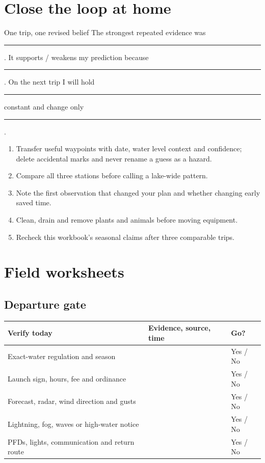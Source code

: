 \section{Close the loop at home}
\begin{teloscard}{One trip, one revised belief}
The strongest repeated evidence was \rule{3.6in}{.4pt}. It supports / weakens
my prediction because \rule{3.25in}{.4pt}. On the next trip I will hold
\rule{1.25in}{.4pt} constant and change only \rule{1.5in}{.4pt}.
\end{teloscard}
\begin{enumerate}
\item Transfer useful waypoints with date, water level context and confidence;
delete accidental marks and never rename a guess as a hazard.
\item Compare all three stations before calling a lake-wide pattern.
\item Note the first observation that changed your plan and whether changing
early saved time.
\item Clean, drain and remove plants and animals before moving equipment.
\item Recheck this workbook's seasonal claims after three comparable trips.
\end{enumerate}

\section{Field worksheets}

\subsection{Departure gate}
\begin{tabularx}{\linewidth}{@{}p{.30\linewidth}X p{.14\linewidth}@{}}
\toprule
\textbf{Verify today} & \textbf{Evidence, source, time} & \textbf{Go?}\\
\midrule
Exact-water regulation and season && Yes / No\\
Launch sign, hours, fee and ordinance && Yes / No\\
Forecast, radar, wind direction and gusts && Yes / No\\
Lightning, fog, waves or high-water notice && Yes / No\\
PFDs, lights, communication and return route && Yes / No\\
\bottomrule
\end{tabularx}

